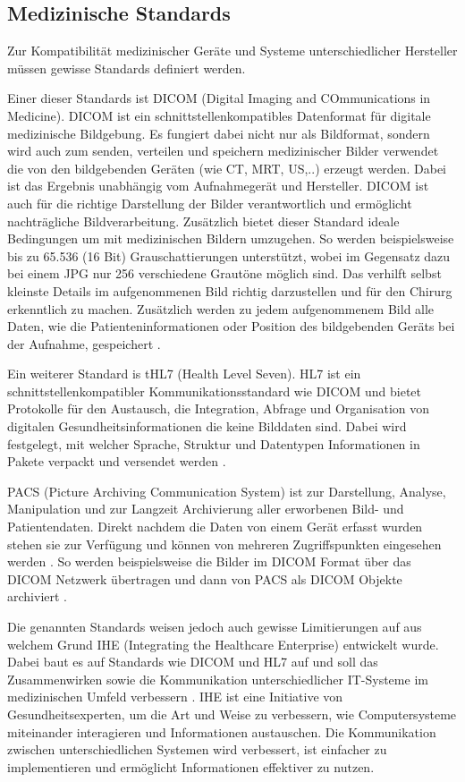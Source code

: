 \subsection{Medizinische Standards}

Zur Kompatibilität medizinischer Geräte und Systeme unterschiedlicher Hersteller müssen gewisse Standards definiert werden.

Einer dieser Standards ist DICOM (Digital Imaging and COmmunications in Medicine). DICOM ist ein schnittstellenkompatibles Datenformat für digitale medizinische Bildgebung. Es fungiert dabei nicht nur als Bildformat, sondern wird auch zum senden, verteilen und speichern medizinischer Bilder verwendet die von den bildgebenden Geräten (wie CT, MRT, US,..) erzeugt werden. Dabei ist das Ergebnis unabhängig vom Aufnahmegerät und Hersteller. DICOM ist auch für die richtige Darstellung der Bilder verantwortlich und ermöglicht nachträgliche Bildverarbeitung.
Zusätzlich bietet dieser Standard ideale Bedingungen um mit medizinischen Bildern umzugehen. So werden beispielsweise bis zu 65.536 (16 Bit) Grauschattierungen unterstützt, wobei im Gegensatz dazu bei einem JPG nur 256 verschiedene Grautöne möglich sind. Das verhilft selbst kleinste Details im aufgenommenen Bild richtig darzustellen und für den Chirurg erkenntlich zu machen. Zusätzlich werden zu jedem aufgenommenem Bild alle Daten, wie die Patienteninformationen oder Position des bildgebenden Geräts bei der Aufnahme, gespeichert \cite{DICOM}.

Ein weiterer Standard is tHL7 (Health Level Seven). HL7 ist ein schnittstellenkompatibler Kommunikationsstandard wie DICOM \cite{DerDigitaleOperationssaal} und bietet Protokolle für den Austausch, die Integration, Abfrage und Organisation von digitalen Gesundheitsinformationen die keine Bilddaten sind. Dabei wird festgelegt, mit welcher Sprache, Struktur und Datentypen Informationen in Pakete verpackt und versendet werden \cite{HL7}.

PACS (Picture Archiving Communication System) ist zur Darstellung, Analyse, Manipulation und zur Langzeit Archivierung aller erworbenen Bild- und Patientendaten. Direkt nachdem die Daten von einem Gerät erfasst wurden stehen sie zur Verfügung und können von mehreren Zugriffspunkten eingesehen werden \cite{PACS}.
So werden beispielsweise die Bilder im DICOM Format über das DICOM Netzwerk übertragen und dann von PACS als DICOM Objekte archiviert \cite{DICOM}.

Die genannten Standards weisen jedoch auch gewisse Limitierungen auf aus welchem Grund IHE (Integrating the Healthcare Enterprise) entwickelt wurde. Dabei baut es auf Standards wie DICOM und HL7 auf und soll das Zusammenwirken sowie die Kommunikation unterschiedlicher IT-Systeme im medizinischen Umfeld verbessern \cite{DICOMundIHE}. 
IHE ist eine Initiative von Gesundheitsexperten, um die Art und Weise zu verbessern, wie Computersysteme miteinander interagieren und Informationen austauschen. Die Kommunikation zwischen unterschiedlichen Systemen wird verbessert, ist einfacher zu implementieren und ermöglicht Informationen effektiver zu nutzen\cite{IHE}.

